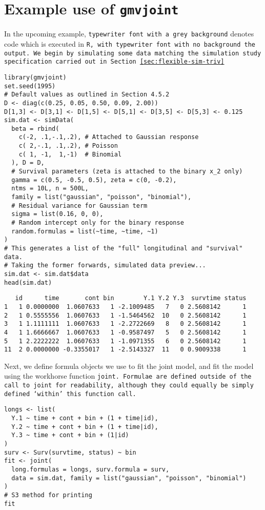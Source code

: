 \section{Example use of \tt{gmvjoint}}\label{sec:appendix-gmvjoint-exampleprogram}
In the upcoming example, \colorbox{backcolour}{\tt{typewriter font with a grey background}} denotes code which is executed in \tt{R}, with \tt{typewriter font with no background} the output. We begin by simulating some data matching the simulation study specification carried out in Section \ref{sec:flexible-sim-triv}
\begin{lstlisting}
library(gmvjoint)
set.seed(1995)
# Default values as outlined in Section 4.5.2
D <- diag(c(0.25, 0.05, 0.50, 0.09, 2.00))
D[1,3] <- D[3,1] <- D[1,5] <- D[5,1] <- D[3,5] <- D[5,3] <- 0.125
sim.dat <- simData(
  beta = rbind(
    c(-2, .1,-.1,.2), # Attached to Gaussian response
    c( 2,-.1, .1,.2), # Poisson
    c( 1, -1,  1,-1)  # Binomial
  ), D = D,
  # Survival parameters (zeta is attached to the binary x_2 only)
  gamma = c(0.5, -0.5, 0.5), zeta = c(0, -0.2),
  ntms = 10L, n = 500L,
  family = list("gaussian", "poisson", "binomial"),
  # Residual variance for Gaussian term
  sigma = list(0.16, 0, 0), 
  # Random intercept only for the binary response
  random.formulas = list(~time, ~time, ~1)
)
# This generates a list of the "full" longitudinal and "survival" data.
# Taking the former forwards, simulated data preview...
sim.dat <- sim.dat$data
head(sim.dat)  
\end{lstlisting}
\vspace*{-5mm}
\begin{small}
\begin{verbatim}
   id      time       cont bin        Y.1 Y.2 Y.3  survtime status
1   1 0.0000000  1.0607633   1 -2.1009485   7   0 2.5608142      1
2   1 0.5555556  1.0607633   1 -1.5464562  10   0 2.5608142      1
3   1 1.1111111  1.0607633   1 -2.2722669   8   0 2.5608142      1
4   1 1.6666667  1.0607633   1 -0.9587497   5   0 2.5608142      1
5   1 2.2222222  1.0607633   1 -1.0971355   6   0 2.5608142      1
11  2 0.0000000 -0.3355017   1 -2.5143327  11   0 0.9009338      1
\end{verbatim}
\end{small}
Next, we define formula objects we use to fit the joint model, and fit the model using the workhorse function \tt{joint}. Formulae are defined outside of the call to \tt{joint} for readability, although they could equally be simply defined `within' this function call. 
\begin{lstlisting}
longs <- list(
  Y.1 ~ time + cont + bin + (1 + time|id),
  Y.2 ~ time + cont + bin + (1 + time|id),
  Y.3 ~ time + cont + bin + (1|id)
)
surv <- Surv(survtime, status) ~ bin
fit <- joint(
  long.formulas = longs, surv.formula = surv,
  data = sim.dat, family = list("gaussian", "poisson", "binomial")
)
# S3 method for printing
fit
\end{lstlisting}

